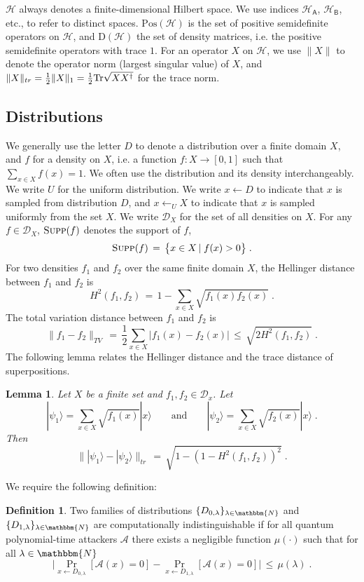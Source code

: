 \documentclass[11pt]{article}
\newtheorem{lemma}[theorem]{Lemma}
\theoremstyle{remark}
\theoremstyle{definition}
\newtheorem{definition}[theorem]{Definition}
\newcommand{\ket}[1]{|#1\rangle}
\newcommand{\Tr}{\mbox{\rm Tr}}
\newcommand{\reg}[1]{{\textsf{#1}}}
\newcommand{\mH}{\mathcal{H}}
\newcommand{\setft}[1]{\mathrm{#1}}
\newcommand{\Density}{\setft{D}}
\newcommand{\Pos}{\setft{Pos}}
\newcommand{\supp}{\textsc{Supp}}
\newcommand{\mN}{\mathbbm{N}}
\begin{document}
 $\mH$ always denotes a finite-dimensional Hilbert space. We use indices $\mH_\reg{A}$, $\mH_\reg{B}$, etc., to refer to distinct spaces. $\Pos(\mH)$ is the set of positive semidefinite operators on $\mH$, and $\Density(\mH)$ the set of density matrices, i.e. the positive semidefinite operators with trace $1$. For an operator $X$ on $\mH$, we use $\|X\|$ to denote the operator norm (largest singular value) of $X$, and $\|X\|_{tr} = \frac{1}{2}\|X\|_1 = \frac{1}{2}\Tr\sqrt{XX^\dagger}$ for the trace norm. 

\subsection{Distributions}

We generally use the letter $D$ to denote a distribution over a finite domain $X$, and $f$ for a density on $X$, i.e. a function $f:X\to[0,1]$ such that $\sum_{x\in X} f(x)=1$. We often use the distribution and its density interchangeably. We write $U$ for the uniform distribution. We write $x\leftarrow D$ to indicate that $x$ is sampled from distribution $D$, and $x\leftarrow_U X$ to indicate that $x$ is sampled uniformly from the set $X$. 
We write $\mathcal{D}_X$ for the set of all densities on $X$.
For any $f\in\mathcal{D}_X$, $\supp(f)$ denotes the support of $f$,
\begin{equation*}
    \supp(f) \,=\, \big\{x\in X \,|\; f(x)> 0\big\}\;.
\end{equation*}
For two densities $f_1$ and $f_2$ over the same finite domain $X$, the Hellinger distance  between $f_1$ and $f_2$ is
\begin{equation}\label{eq:bhatt}
H^2(f_1,f_2) \,=\, 1- \sum_{x\in X}\sqrt{f_1(x)f_2(x)}\;.
\end{equation}
The total variation distance between $f_1$ and $f_2$ is
\begin{equation}\label{eq:stattobhatt}
\|f_1-f_2\|_{TV} \,=\, \frac{1}{2} \sum_{x\in X}|f_1(x) - f_2(x)| \,\leq\, \sqrt{2H^2(f_1,f_2)}\;.
\end{equation}
The following lemma relates the Hellinger distance and the trace distance of superpositions. 
\begin{lemma}
Let $X$ be a finite set and $f_1,f_2\in\mathcal{D}_x$. Let 
$$ \ket{\psi_1}=\sum_{x\in X}\sqrt{f_1(x)}\ket{x}\qquad\text{and}\qquad  \ket{\psi_2}=\sum_{x\in X}\sqrt{f_2(x)}\ket{x}\;.$$
 Then 
 $$\|\ket{\psi_1}-\ket{\psi_2}\|_{tr}\,=\, \sqrt{ 1 - (1-H^2(f_1,f_2))^2}\;.$$
\end{lemma}
We require the following definition:
\begin{definition}\label{def:compinddist}
Two families of distributions $\{D_{0,\lambda}\}_{\lambda\in\mN}$ and $\{D_{1,\lambda}\}_{\lambda\in\mN}$ are computationally indistinguishable if for all quantum polynomial-time attackers $\mathcal{A}$ there exists a negligible function $\mu(\cdot)$ such that for all $\lambda\in\mN$
\begin{equation}
\Big|\Pr_{x\leftarrow D_{0,\lambda}}[\mathcal{A}(x) = 0] - \Pr_{x\leftarrow D_{1,\lambda}}[\mathcal{A}(x) = 0]\Big| \,\leq\, \mu(\lambda)\;.
\end{equation}
\end{definition}
\end{document}
